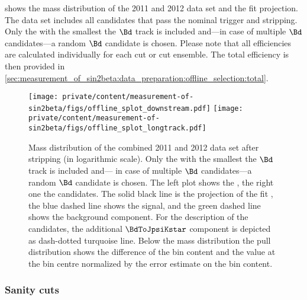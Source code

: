  shows the mass
distribution of the 2011 and 2012 data set and the fit projection. The data set
includes  all candidates that pass the nominal trigger and stripping. Only the
\PV with the smallest \IP \chisqndf \wrt the $\Bd$ track is included and---in
case of multiple $\Bd$ candidates---a random $\Bd$ candidate is chosen. Please
note that all efficiencies are calculated individually for each cut or cut
ensemble. The total efficiency is then provided in
\cref{sec:measurement_of_sin2beta:data_preparation:offline_selection:total}.
%
\begin{figure}
\texttt{[image: private/content/measurement-of-sin2beta/figs/offline\_splot\_downstream.pdf]}
\texttt{[image: private/content/measurement-of-sin2beta/figs/offline\_splot\_longtrack.pdf]}
\label{fig:measurement_of_sin2beta:data_preparation:offline_selection:before}
\caption{Mass distribution of the combined 2011 and 2012 data set after
stripping (in logarithmic scale). Only the \PV with the smallest \IP \chisqndf
\wrt the $\Bd$ track is included and--- in case of multiple $\Bd$ candidates---a
random $\Bd$ candidate is chosen. The left plot shows the \catDD, the right one
the \catLL candidates. The solid black line is the projection of the fit \PDF,
the blue dashed line shows the signal, and the green dashed line shows the
background component. For the description of the \catLL candidates, the
additional $\BdToJpsiKstar$ component is depicted as dash-dotted turquoise line.
Below the mass distribution the pull distribution shows the difference of the
bin content and the \PDF value at the bin centre normalized by the error
estimate on the bin content.}
\end{figure}

\subsubsection{Sanity cuts}
\label{sec:measurement_of_sin2beta:data_preparation:offline_selection:sanity}

